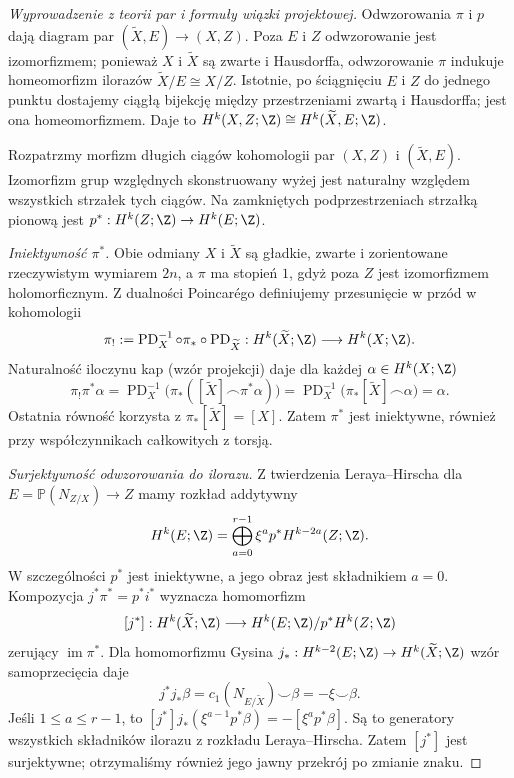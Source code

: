 \begin{proof}[Wyprowadzenie z teorii par i formuły wiązki projektowej]
Odwzorowania $\pi$ i $p$ dają diagram par
$(\widetilde X,E)\to(X,Z)$.
Poza $E$ i $Z$ odwzorowanie jest izomorfizmem;
ponieważ $X$ i $\widetilde X$ są zwarte i Hausdorffa, odwzorowanie
$\pi$ indukuje homeomorfizm ilorazów
$\widetilde X/E\cong X/Z$. Istotnie, po ściągnięciu $E$ i $Z$
do jednego punktu dostajemy ciągłą bijekcję między przestrzeniami
zwartą i Hausdorffa; jest ona homeomorfizmem. Daje to
$H^k(X,Z;\Z)\cong H^k(\widetilde X,E;\Z)$.

Rozpatrzmy morfizm długich ciągów kohomologii par
$(X,Z)$ i $(\widetilde X,E)$.
Izomorfizm grup względnych skonstruowany wyżej jest
naturalny względem wszystkich strzałek tych ciągów.
Na zamkniętych podprzestrzeniach strzałką pionową
jest $p^*:H^k(Z;\Z)\to H^k(E;\Z)$.

\emph{Iniektywność $\pi^*$.}
Obie odmiany $X$ i $\widetilde X$ są gładkie,
zwarte i zorientowane rzeczywistym wymiarem $2n$,
a $\pi$ ma stopień $1$, gdyż poza $Z$ jest
izomorfizmem holomorficznym. Z dualności Poincarégo
definiujemy przesunięcie w przód w kohomologii
\[
 \pi_!:=
 \operatorname{PD}_X^{-1}\circ\pi_*
       \circ\operatorname{PD}_{\widetilde X}
 :H^k(\widetilde X;\Z)\longrightarrow H^k(X;\Z).
\]
Naturalność iloczynu kap (wzór projekcji)
daje dla każdej $\alpha\in H^k(X;\Z)$
\[
 \pi_!\pi^*\alpha
 =\operatorname{PD}_X^{-1}
   \bigl(\pi_*([\widetilde X]\frown\pi^*\alpha)\bigr)
 =\operatorname{PD}_X^{-1}
   \bigl(\pi_*[\widetilde X]\frown\alpha\bigr)
 =\alpha.
\]
Ostatnia równość korzysta z
$\pi_*[\widetilde X]=[X]$.
Zatem $\pi^*$ jest iniektywne, również
przy współczynnikach całkowitych z torsją.

\emph{Surjektywność odwzorowania do ilorazu.}
Z twierdzenia Leraya--Hirscha dla
$E=\mathbb P(N_{Z/X})\to Z$ mamy rozkład addytywny
\[
 H^k(E;\Z)=
 \bigoplus_{a=0}^{r-1}\xi^a p^*H^{k-2a}(Z;\Z).
\]
W szczególności $p^*$ jest iniektywne, a jego
obraz jest składnikiem $a=0$.
Kompozycja
$j^*\pi^*=p^*i^*$ wyznacza homomorfizm
\[
 [j^*]:H^k(\widetilde X;\Z)\longrightarrow
 H^k(E;\Z)/p^*H^k(Z;\Z)
\]
zerujący $\operatorname{im}\pi^*$.
Dla homomorfizmu Gysina
$j_*:H^{k-2}(E;\Z)\to H^k(\widetilde X;\Z)$
wzór samoprzecięcia daje
\[
 j^*j_*\beta
 =c_1(N_{E/\widetilde X})\smile\beta
 =-\xi\smile\beta.
\]
Jeśli $1\le a\le r-1$, to
$[j^*]j_*(\xi^{a-1}p^*\beta)=-[\xi^ap^*\beta]$.
Są to generatory wszystkich składników ilorazu
z rozkładu Leraya--Hirscha. Zatem $[j^*]$
jest surjektywne; otrzymaliśmy również jego
jawny przekrój po zmianie znaku.


\end{proof}
